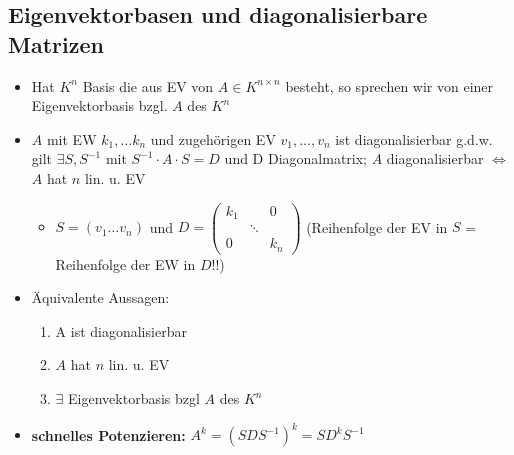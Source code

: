 \documentclass[10pt,a4paper]{article}
\begin{document}
\subsection{Eigenvektorbasen und diagonalisierbare Matrizen}
\begin{itemize}
\item Hat $K^{n}$ Basis die aus EV von $A\in K^{n\times n}$ besteht, so sprechen wir von einer Eigenvektorbasis bzgl. $A$ des $K^{n}$
\item $A$ mit EW $k_{1},\dotsc k_{n}$ und zugehörigen EV $v_{1},\dotsc,v_{n}$ ist diagonalisierbar g.d.w. gilt $\exists S,S^{-1}$ mit $S^{-1}\cdot A \cdot S =D$ und D Diagonalmatrix; $A$ diagonalisierbar $\Leftrightarrow$ $A$ hat $n$ lin. u. EV
\begin{itemize}
\item$S=(v_{1}\dotsc v_{n})$ und $ D=\begin{pmatrix}
k_{1}&&0\\&\ddots&\\0&&k_{n}
\end{pmatrix}$ (Reihenfolge der EV in $S$ = Reihenfolge der EW in $D$!!)
\end{itemize}
\item Äquivalente Aussagen:
\begin{enumerate}
\item A ist diagonalisierbar
\item $A$ hat $n$ lin. u. EV
\item $\exists$ Eigenvektorbasis bzgl $A$ des $K^{n}$
\end{enumerate}
\item \textbf{schnelles Potenzieren:} $A^{k}=(SDS^{-1})^{k}=SD^{k}S^{-1}$
\end{itemize}
\end{document}
